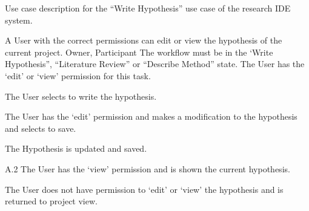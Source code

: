 \documentclass[document.tex]{subfiles}
\begin{document}
\begin{table}
  \centering
  \caption{Use case description for the ``Write Hypothesis'' use case of the research IDE system.}
  \label{tbl:use-case-write-hypothesis}

  \begin{usecase}
    A User with the correct permissions can edit or view the hypothesis of the current project.
    Owner, Participant
    The workflow must be in the ‘Write Hypothesis”, “Literature Review” or “Describe Method” state. The User has the ‘edit’ or ‘view’ permission for this task.
    \ucnormal
    \begin{ucenum}
      \item The User selects to write the hypothesis.
      \item The User has the ‘edit’ permission and makes a modification to the hypothesis and selects to save.
      \item The Hypothesis is updated and saved.
    \end{ucenum}
    \begin{ucenum}
      \item [A.2] The User has the ‘view’ permission and is shown the current hypothesis.
    \end{ucenum}
    The User does not have permission to ‘edit’ or ‘view’ the hypothesis and is returned to project view.
  \end{usecase}
\end{table}
\end{document}
